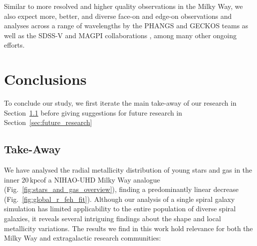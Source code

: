 \documentclass[fleqn,usenatbib]{mnras}
\newcommand{\nihaoRmax}{$20\,\mathrm{kpc}$}
\begin{document}
Similar to more resolved and higher quality observations in the Milky Way, we also expect more, better, and diverse face-on and edge-on observations and analyses across a range of wavelengths by the PHANGS and GECKOS teams \citep{Kreckel2019, Kreckel2020, GECKOS2023} as well as the SDSS-V and MAGPI collaborations \citep{Kollmeier2017, MAGPI2021, Mun2024, Chen2024}, among many other ongoing efforts.

\section{Conclusions}
\label{sec:conc}

To conclude our study, we first iterate the main take-away of our research in Section~\ref{sec:take_away} before giving suggestions for future research in Section~\ref{sec:future_research}

\subsection{Take-Away} \label{sec:take_away}

We have analysed the radial metallicity distribution of young stars and gas in the inner \nihaoRmax of a NIHAO-UHD Milky Way analogue (Fig.~\ref{fig:stars_and_gas_overview}), finding a predominantly linear decrease (Fig.~\ref{fig:global_r_feh_fit}). Although our analysis of a single spiral galaxy simulation has limited applicability to the entire population of diverse spiral galaxies, it reveals several intriguing findings about the shape and local metallicity variations. The results we find in this work hold relevance for both the Milky Way and extragalactic research communities:
\end{document}
